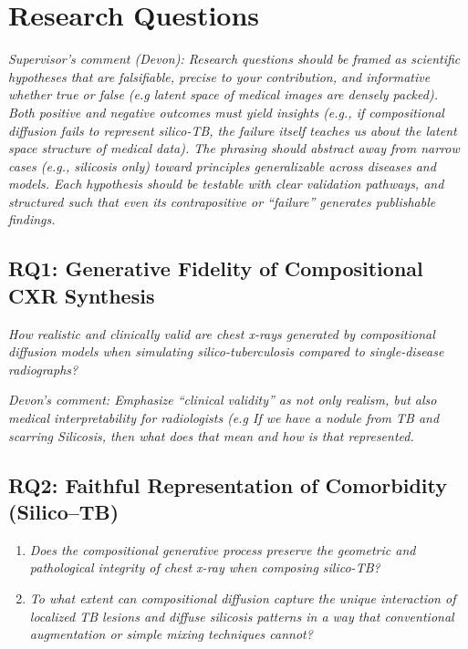 \section{Research Questions}

\footnotesize{\textit{Supervisor’s comment (Devon): Research questions should be framed as scientific hypotheses that are falsifiable, precise to your contribution, and informative whether true or false (e.g latent space of medical images are densely packed). Both positive and negative outcomes must yield insights (e.g., if compositional diffusion fails to represent silico-TB, the failure itself teaches us about the latent space structure of medical data). The phrasing should abstract away from narrow cases (e.g., silicosis only) toward principles generalizable across diseases and models. Each hypothesis should be testable with clear validation pathways, and structured such that even its contrapositive or “failure” generates publishable findings.}} \normalsize

\subsection{RQ1: Generative Fidelity of Compositional CXR Synthesis}
\label{subsec:rq1}
\textit{How realistic and clinically valid are chest x-rays generated by compositional diffusion models when simulating silico-tuberculosis compared to single-disease radiographs?}

\footnotesize{\textit{Devon’s comment: Emphasize “clinical validity” as not only realism, but also medical interpretability for radiologists (e.g If we have a nodule from TB and scarring Silicosis, then what does that mean and how is that represented.}} \normalsize

\subsection{RQ2: Faithful Representation of Comorbidity (Silico--TB)}
\label{subsec:rq2}
\begin{enumerate}
    \item \textit{Does the compositional generative process preserve the geometric and pathological integrity of chest x-ray when composing silico-TB?}
    \item \textit{To what extent can compositional diffusion capture the unique interaction of localized TB lesions and diffuse silicosis patterns in a way that conventional augmentation or simple mixing techniques cannot?}
\end{enumerate}

